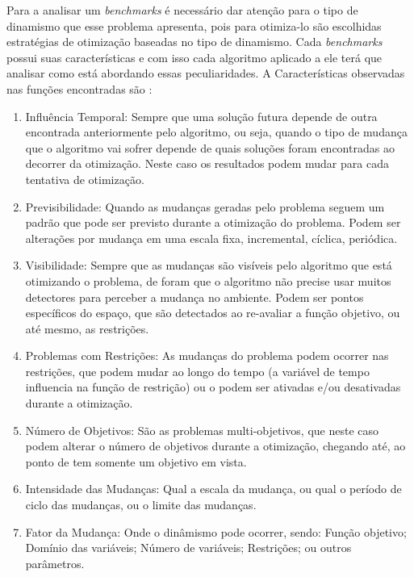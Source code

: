 Para a analisar um \textit{benchmarks} é necessário dar atenção para o tipo de dinamismo que esse problema apresenta, pois para otimiza-lo são escolhidas estratégias de otimização baseadas no tipo de dinamismo. Cada \textit{benchmarks} possui suas características e com isso cada algoritmo aplicado a ele terá que analisar como está abordando essas peculiaridades. A Características observadas nas funções encontradas são \cite{cruz2011optimization}:

\begin{enumerate}
\item Influência Temporal: Sempre que uma solução futura depende de outra encontrada anteriormente pelo algoritmo, ou seja, quando o tipo de mudança que o algoritmo vai sofrer depende de quais soluções foram encontradas ao decorrer da otimização. Neste caso os resultados podem mudar para cada tentativa de otimização.

\item Previsibilidade: Quando as mudanças geradas pelo problema seguem um padrão que pode ser previsto durante a otimização do problema. Podem ser alterações por mudança em uma escala fixa, incremental, cíclica, periódica.

\item Visibilidade: Sempre que as mudanças são visíveis pelo algoritmo que está otimizando o problema, de foram que o algoritmo não precise usar muitos detectores para perceber a mudança no ambiente. Podem ser pontos específicos do espaço, que são detectados ao re-avaliar a função objetivo, ou até mesmo, as restrições.

\item Problemas com Restrições: As mudanças do problema podem ocorrer nas restrições, que podem mudar ao longo do tempo (a variável de tempo influencia na função de restrição) ou o podem ser ativadas e/ou desativadas durante a otimização.

\item Número de Objetivos: São as problemas multi-objetivos, que neste caso podem alterar o número de objetivos durante a otimização, chegando até, ao ponto de tem somente um objetivo em vista.

\item Intensidade das Mudanças: Qual a escala da mudança, ou qual o período de ciclo das mudanças, ou o limite das mudanças.

\item Fator da Mudança: Onde o dinâmismo pode ocorrer, sendo: Função objetivo; Domínio das variáveis; Número de variáveis; Restrições; ou outros parâmetros.  
\end{enumerate}

